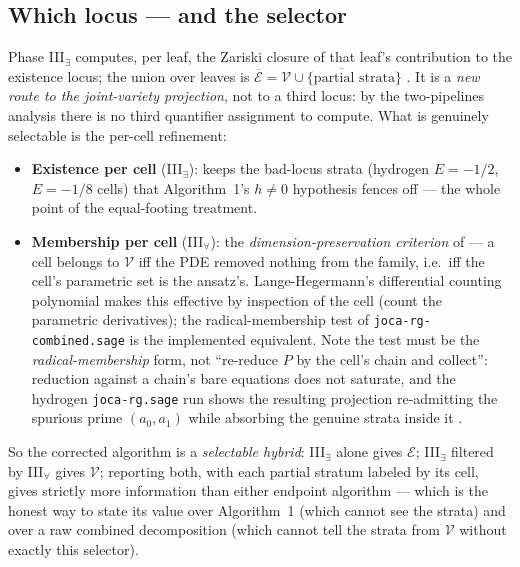 \documentclass[11pt]{article}
\newcommand{\Var}{\mathcal{V}}
\newcommand{\Ex}{\mathcal{E}}
\newcommand{\code}[1]{\texttt{#1}}
\begin{document}
\subsection{Which locus --- and the selector}

Phase III$_\exists$ computes, per leaf, the Zariski closure of that leaf's
contribution to the existence locus; the union over leaves is
$\overline{\Ex} = \overline{\Var \cup \{\text{partial strata}\}}$
\cite[\S2bis(b), superset remark]{bounded-prolongation-note}. It is a
\emph{new route to the joint-variety projection}, not to a third locus: by
the two-pipelines analysis there is no third quantifier assignment to
compute. What is genuinely selectable is the per-cell refinement:

\begin{itemize}
\item \textbf{Existence per cell} (III$_\exists$): keeps the bad-locus
  strata (hydrogen $E=-1/2$, $E=-1/8$ cells) that Algorithm~1's
  $h\ne0$ hypothesis fences off --- the whole point of the equal-footing
  treatment.
\item \textbf{Membership per cell} (III$_\forall$): the
  \emph{dimension-preservation criterion} of
  \cite[\S{}The correct selection criterion]{membership-note} --- a cell
  belongs to $\Var$ iff the PDE removed nothing from the family, i.e.\ iff
  the cell's parametric set is the ansatz's. Lange-Hegermann's differential
  counting polynomial \cite{LH2014} makes this effective by inspection of
  the cell (count the parametric derivatives); the radical-membership test of
  \code{joca-rg-combined.sage} is the implemented equivalent. Note the test
  must be the \emph{radical-membership} form, not ``re-reduce $P$ by the
  cell's chain and collect'': reduction against a chain's bare equations does
  not saturate, and the hydrogen \code{joca-rg.sage} run shows the resulting
  projection re-admitting the spurious prime $(a_0,a_1)$ while absorbing the
  genuine strata inside it \cite{README}.
\end{itemize}

So the corrected algorithm is a \emph{selectable hybrid}: III$_\exists$ alone
gives $\Ex$; III$_\exists$ filtered by III$_\forall$ gives $\Var$; reporting
both, with each partial stratum labeled by its cell, gives strictly more
information than either endpoint algorithm --- which is the honest way to
state its value over Algorithm~1 (which cannot see the strata) and over a raw
combined decomposition (which cannot tell the strata from $\Var$ without
exactly this selector).
\end{document}
